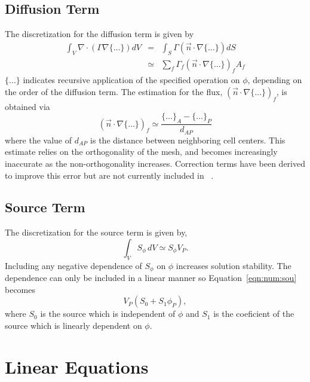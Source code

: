 \subsection{Diffusion Term}

The discretization for the diffusion term is given by
\begin{eqnarray}
\int_V \nabla \cdot (\Gamma\nabla\{\ldots\}) dV 
& = & \int_S \Gamma (\vec{n} \cdot \nabla\{\ldots\}) dS \\
& \simeq & \sum_f \Gamma_f (\vec{n} \cdot \nabla\{\ldots\})_f A_f
\label{eqn:num:dif}
\end{eqnarray}
$\{\ldots\}$ indicates recursive application of the specified 
operation on \( \phi \), depending on 
the order of the diffusion term.
The estimation for the flux, $(\vec{n} \cdot \nabla\{\ldots\})_f$, is
obtained via
\begin{equation}
(\vec{n} \cdot \nabla\{\ldots\})_f \simeq \frac{\{\ldots\}_A-\{\ldots\}_P}{d_{AP}}
\end{equation}
where the value of $d_{AP}$ is the distance between neighboring cell
centers.  This estimate relies on the orthogonality of the mesh, and
becomes increasingly inaccurate as the non-orthogonality increases.
Correction terms have been derived to improve this error but are not
currently included in \FiPy{}~\cite{croftphd}.

\subsection{Source Term}

The discretization for the source term is given by, 
\begin{equation}
\int_V S_{\phi}\,dV \simeq S_\phi V_P.
\label{eqn:num:sou}
\end{equation}
Including any negative dependence of $S_\phi$ on $\phi$ increases
solution stability. The dependence can only be included in a linear
manner so Equation~\eqref{eqn:num:sou} becomes
\begin{equation}
V_P (S_0 + S_1 \phi_P),
\end{equation}
where \( S_0 \) is the source which is independent of \( \phi \) and
\( S_1 \) is the coeficient of the source which is linearly dependent
on \( \phi \).

\section{Linear Equations}
\label{section:linear-equations}

